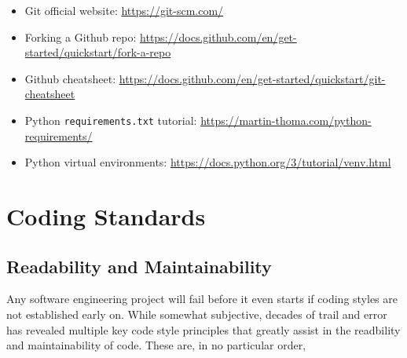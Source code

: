\documentclass[11pt]{article}
\begin{document}
\begin{itemize}
    \item Git official website: \url{https://git-scm.com/}
    \item Forking a Github repo: \url{https://docs.github.com/en/get-started/quickstart/fork-a-repo}
    \item Github cheatsheet: \url{https://docs.github.com/en/get-started/quickstart/git-cheatsheet}
    \item Python \texttt{requirements.txt} tutorial: \url{https://martin-thoma.com/python-requirements/}
    \item Python virtual environments: \url{https://docs.python.org/3/tutorial/venv.html}
\end{itemize}

\newpage

\section{Coding Standards}

\subsection{Readability and Maintainability}

Any software engineering project will fail before it even starts if coding styles are not established early on. While somewhat subjective, decades of trail and error has revealed multiple key code style principles that greatly assist in the readbility and maintainability of code. These are, in no particular order,
\end{document}
